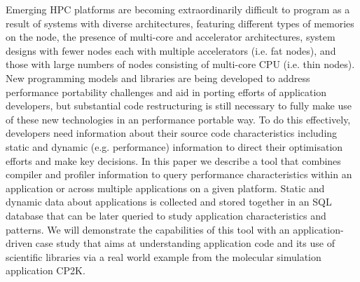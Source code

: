 Emerging HPC platforms are becoming extraordinarily difficult to program as a result of systems with diverse architectures, featuring different types of memories on the node, the presence of multi-core and accelerator architectures, system designs with fewer nodes each with multiple accelerators (i.e. fat nodes), and those with large numbers of nodes consisting of multi-core \acs{CPU} (i.e. thin nodes).
New programming models and libraries are being developed to address performance portability challenges and aid in porting efforts of application developers, but substantial code restructuring is still necessary to fully make use of these new technologies in an performance portable way.
To do this effectively, developers need information about their source code characteristics including static and dynamic (e.g. performance) information to direct their optimisation efforts and make key decisions.
In this paper we describe a tool that combines compiler and profiler information to query performance characteristics within an application or across multiple applications on a given platform.
Static and dynamic data about applications is collected and stored together in an \acs{SQL} database that can be later queried to study application characteristics and patterns.
We will demonstrate the capabilities of this tool with an application-driven case study that aims at understanding application code and its use of scientific libraries via a real world example from the molecular simulation application CP2K.
